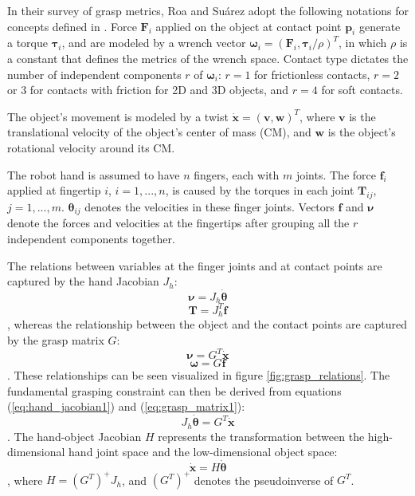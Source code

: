 In their survey of grasp metrics, Roa and Su{\'a}rez \cite{Roa2015} adopt the following notations for concepts defined
in \cite{Murray1994}. Force $ \boldsymbol{F}_i $ applied on the object at contact point $ \boldsymbol{p}_i $ generate a
torque $ \boldsymbol{\tau}_i $, and are modeled by a wrench vector
$ \boldsymbol{\omega}_i = (\boldsymbol{F}_i, \boldsymbol{\tau}_i/\rho)^T $, in which $ \rho $ is a constant that defines
the metrics of the wrench space. Contact type dictates the number of independent components $ r $ of
$ \boldsymbol{\omega}_i $: $ r=1 $ for frictionless contacts, $ r = 2 $ or $ 3 $ for contacts with friction for 2D and
3D objects, and $ r = 4 $ for soft contacts.

The object's movement is modeled by a twist $ \boldsymbol{\dot{x}} = (\boldsymbol{v}, \boldsymbol{w})^T $, where
$ \boldsymbol{v} $ is the translational velocity of the object's center of mass (CM), and $ \boldsymbol{w} $ is the
object's rotational velocity around its CM.

The robot hand is assumed to have $ n $ fingers, each with $ m $ joints. The force $ \boldsymbol{f}_i $ applied at
fingertip $ i $, $ i = 1,...,n $, is caused by the torques in each joint $ \boldsymbol{T}_{ij} $, $ j = 1,...,m$.
$ \boldsymbol{\theta}_{ij} $ denotes the velocities in these finger joints. Vectors $ \boldsymbol{f} $ and
$ \boldsymbol{\nu} $ denote the forces and velocities at the fingertips after grouping all the $ r $ independent
components together.

The relations between variables at the finger joints and at contact points are captured by the hand Jacobian
$ J_h $:
\begin{equation} \label{eq:hand_jacobian1}
\boldsymbol{\nu} = J_h \boldsymbol{\dot{\theta}}
\end{equation}
\begin{equation} \label{eq:hand_jacobian2}
\boldsymbol{T} = J_h^T \boldsymbol{f}
\end{equation}
, whereas the relationship between the object and the contact points are captured by the grasp matrix $ G $:
\begin{equation} \label{eq:grasp_matrix1}
\boldsymbol{\nu} = G^T \boldsymbol{\dot{x}}
\end{equation}
\begin{equation} \label{eq:grasp_matrix2}
\boldsymbol{\omega} = G \boldsymbol{f}
\end{equation}
. These relationships can be seen visualized in figure \ref{fig:grasp_relations}. The fundamental grasping constraint
can then be derived from equations (\ref{eq:hand_jacobian1}) and (\ref{eq:grasp_matrix1}):
\begin{equation} \label{eq:grasp_constraint}
J_h \boldsymbol{\dot{\theta}} = G^T \boldsymbol{\dot{x}}
\end{equation}
. The hand-object Jacobian $ H $ represents the transformation between the high-dimensional hand joint space and the
low-dimensional object space:
\begin{equation} \label{eq:hand_object_jacobian}
\boldsymbol{\dot{x}} = H \boldsymbol{\dot{\theta}}
\end{equation}
, where $ H = (G^T)^+ J_h $, and $ (G^T)^+ $ denotes the pseudoinverse of $ G^T $.

